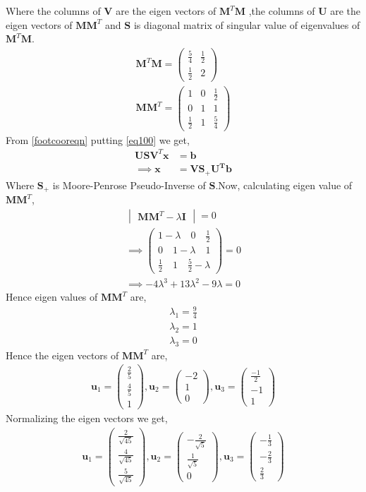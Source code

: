 \documentclass[journal,12pt,twocolumn]{IEEEtran}
\newcommand{\myvec}[1]{\ensuremath{\begin{pmatrix}#1\end{pmatrix}}}
\newcommand{\mydet}[1]{\ensuremath{\begin{vmatrix}#1\end{vmatrix}}}
\numberwithin{equation}{subsection}
\let\vec\mathbf
\begin{document}
Where the columns of $\vec{V}$ are the eigen vectors of $\vec{M}^T\vec{M}$ ,the columns of $\vec{U}$ are the eigen vectors of $\vec{M}\vec{M}^T$ and $\vec{S}$ is diagonal matrix of singular value of eigenvalues of $\vec{M}^T\vec{M}$.
\begin{align}
\vec{M}^T\vec{M}=\myvec{\frac{5}{4}&\frac{1}{2}\\\frac{1}{2}&2}\label{eqMTM}\\
\vec{M}\vec{M}^T=\myvec{1&0&\frac{1}{2}\\0&1&1\\\frac{1}{2}&1&\frac{5}{4}}
\end{align}
From \eqref{footcooreqn} putting \eqref{eq100} we get,
\begin{align}\label{eqX}
\vec{U}\vec{S}\vec{V}^T\vec{x} & = \vec{b}\\
\implies\vec{x} &= \vec{V}\vec{S_+}\vec{U^T}\vec{b}
\end{align}
Where $\vec{S_+}$ is Moore-Penrose Pseudo-Inverse of $\vec{S}$.Now, calculating eigen value of $\vec{M}\vec{M}^T$,
\begin{align}
\mydet{\vec{M}\vec{M}^T - \lambda\vec{I}} = 0\\
\implies\myvec{1-\lambda\quad0\quad\frac{1}{2}\\0\quad1-\lambda\quad1\\\frac{1}{2}\quad1\quad\frac{5}{2}-\lambda} =0\\
\implies-4\lambda^3+13 \lambda^2-9\lambda =0
\end{align}
Hence eigen values of $\vec{M}\vec{M}^T$ are,
\begin{align}
\lambda_1 =\frac{9}{4}\\
\lambda_2 = 1\\
\lambda_3 =0
\end{align}
Hence the eigen vectors of $\vec{M}\vec{M}^T$ are,
\begin{align}
\vec{u}_1=\myvec{\frac{2}{5}\\\frac{4}{5}\\1},
\vec{u}_2=\myvec{-2\\1\\0},
\vec{u}_3=\myvec{\frac{-1}{2}\\-1\\1}
\end{align}
Normalizing the eigen vectors we get,
\begin{align}
\vec{u}_1=\myvec{\frac{2}{\sqrt{45}}\\\frac{4}{\sqrt{45}}\\\frac{5}{\sqrt{45}}},
\vec{u}_2=\myvec{-\frac{2}{\sqrt{5}}\\\frac{1}{\sqrt{5}}\\0},
\vec{u}_3=\myvec{-\frac{1}{3}\\-\frac{2}{3}\\\frac{2}{3}}
\end{align}
\end{document}

